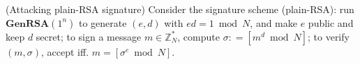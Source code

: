 \begin{questions}
  
  \question (Attacking plain-RSA signature) Consider the signature
  scheme (plain-RSA): run $\textbf{GenRSA}(1^n)$ to generate $(e,d)$
  with $ed = 1 \bmod N$, and make $e$ public and keep $d$ secret; to
  sign a message $m \in \mathbb{Z}_N^*$, compute
  $\sigma: = [m^d \bmod N]$; to verify $(m,\sigma)$, accept iff.
  $m = [\sigma^e \bmod N]$. 

  
\end{questions}



